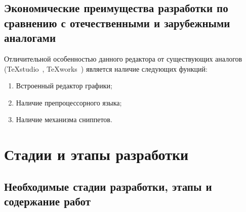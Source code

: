 \documentclass[techtask]{espd}
\begin{document}
\subsection{Экономические преимущества разработки по сравнению с отечественными и зарубежными аналогами}
Отличительной особенностью данного редактора от существующих аналогов (TeXstudio~\cite{texstudio}, TeXworks~\cite{texworks}) является наличие следующих функций:

\begin{enumerate}
\item Встроенный редактор графики;
\item Наличие препроцессорного языка;
\item Наличие механизма сниппетов.
\end{enumerate}

\section{Стадии и этапы разработки}
\subsection{Необходимые стадии разработки, этапы и содержание работ}
\end{document}
